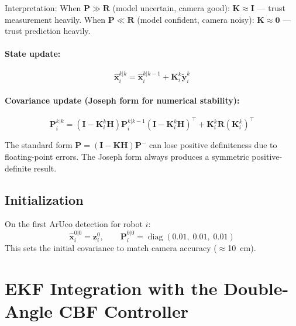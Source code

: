 \documentclass[12pt,a4paper]{article}
\begin{document}
Interpretation: When $\bm{P} \gg \bm{R}$ (model uncertain, camera good):
$\bm{K} \approx \bm{I}$ --- trust measurement heavily.
When $\bm{P} \ll \bm{R}$ (model confident, camera noisy):
$\bm{K} \approx \bm{0}$ --- trust prediction heavily.

\paragraph{State update:}
\begin{mathbox}
\begin{equation}
  \hat{\bm{x}}_i^{k|k} = \hat{\bm{x}}_i^{k|k-1} + \bm{K}_i^k \tilde{\bm{y}}_i^k
  \label{eq:state_update}
\end{equation}
\end{mathbox}

\paragraph{Covariance update (Joseph form for numerical stability):}
\begin{mathbox}
\begin{equation}
  \bm{P}_i^{k|k} =
  \left(\bm{I} - \bm{K}_i^k\bm{H}\right)\bm{P}_i^{k|k-1}
  \left(\bm{I} - \bm{K}_i^k\bm{H}\right)^\top
  + \bm{K}_i^k \bm{R} \left(\bm{K}_i^k\right)^\top
  \label{eq:cov_update}
\end{equation}
\end{mathbox}

The standard form $\bm{P} = (\bm{I}-\bm{K}\bm{H})\bm{P}^{-}$ can lose positive
definiteness due to floating-point errors. The Joseph form always produces a
symmetric positive-definite result.

\subsection{Initialization}

On the first ArUco detection for robot $i$:
\begin{equation}
  \hat{\bm{x}}_i^{0|0} = \bm{z}_i^0, \qquad
  \bm{P}_i^{0|0} = \operatorname{diag}(0.01,\; 0.01,\; 0.01)
\end{equation}
This sets the initial covariance to match camera accuracy ($\approx$10~cm).

\section{EKF Integration with the Double-Angle CBF Controller}
\label{sec:integration}
\end{document}
